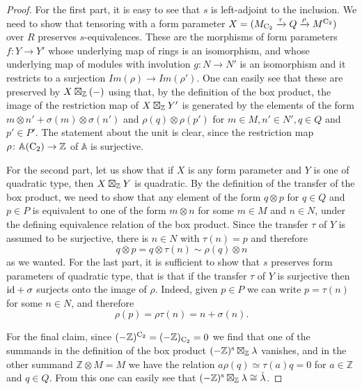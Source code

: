 \begin{proof}
For the first part, it is easy to see that $s$ is left-adjoint to the inclusion. We need to show that tensoring with a form parameter $X=(M_{\mathrm{C_2}}\xrightarrow{\tau}Q\xrightarrow{\rho}M^{\mathrm{C_2}})$ over $R$ preserves $s$-equivalences. These are the morphisms of form parameters $f\colon Y\to Y'$ whose underlying map of rings is an isomorphism, and whose underlying map of modules with involution $g\colon N\to N'$ is an isomorphism and it restricts to a surjection $Im(\rho)\to Im(\rho')$. One can easily see that these are preserved by $X\boxtimes_{\mathbb{Z}} (-)$ using that, by the definition of the box product, the image of the restriction map of $X\boxtimes_{\mathbb{Z}} Y'$ is generated by the elements of the form $m\otimes n'+\sigma(m)\otimes\sigma(n')$ and $\rho(q)\otimes\rho(p')$ for $m\in M, n'\in N', q\in Q$ and $p'\in P'$. The statement about the unit is clear, since the restriction map $\rho\colon\mathbb{A}(\mathrm{C_2})\to\mathbb{Z}$ of $\mathbb{A}$ is surjective.



For the second part, let us show that if $X$ is any form parameter and $Y$ is one of quadratic type, then $X\boxtimes_{\mathbb{Z}} Y$ is quadratic. By the definition of the transfer of the box product, we need to show that any element of the form $q\otimes p$ for $q\in Q$ and $p\in P$ is equivalent to one of the form $m\otimes n$ for some $m\in M$ and $n\in N$, under the defining equivalence relation of the box product. Since the transfer $\tau$ of $Y$ is assumed to be surjective, there is $n\in N$ with $\tau(n)=p$ and therefore
\[
q\otimes p=q\otimes \tau(n)\sim \rho(q)\otimes n
\]
as we wanted. For the last part, it is sufficient to show that $s$ preserves form parameters of quadratic type, that is that if the transfer $\tau$ of $Y$ is surjective then $\mathrm{id}+\sigma$ surjects onto the image of $\rho$. Indeed, given $p\in P$ we can write $p=\tau(n)$ for some $n\in N$, and therefore
\[
\rho(p)=\rho \tau(n)=n+\sigma(n).
\]


For the final claim, since $(-\mathbb{Z})^{\mathrm{C_2}}=(-\mathbb{Z})_{\mathrm{C_2}}=0$ we find that one of the summands in the definition of the box product $(-\mathbb{Z})^{\mathrm{s}}\boxtimes_{\mathbb{Z}}\lambda$ vanishes, and in the other summand $\mathbb{Z}\otimes M=M$ we have the relation $a\rho(q)\simeq \tau(a)q=0$ for $a\in\mathbb{Z}$ and $q\in Q$. From this one can easily see that $(-\mathbb{Z})^{\mathrm{s}}\boxtimes_{\mathbb{Z}}\lambda\cong \check{\lambda}$.
\end{proof}


